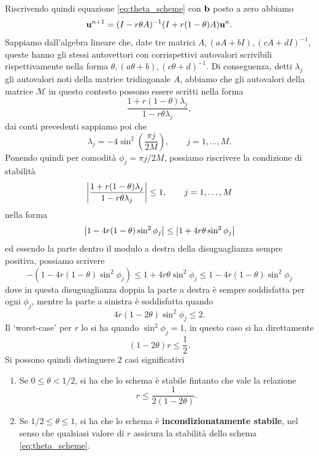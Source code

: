 \documentclass[10pt,a4paper]{article}
\begin{document}
Riscrivendo quindi equazione \eqref{eq:theta_scheme} con $\vb{b}$ posto a zero abbiamo
\begin{equation}
	\vb{u}^{n+1} = (I-r\theta A)^{-1}(I+r(1-\theta)A)\vb{u}^n.
\end{equation}
Sappiamo dall'algebra lineare che, date tre matrici $A, (aA+bI), (cA+dI)^{-1}$, queste hanno gli stessi autovettori con corrispettivi autovalori scrivibili rispettivamente nella forma $\theta, (a\theta + b), (c\theta +d)^{-1}$. Di conseguenza, detti $\lambda_j$ gli autovalori noti della matrice tridiagonale $A$, abbiamo che gli autovalori della matrice $\mathcal{M}$ in questo contesto possono essere scritti nella forma
\begin{equation}
	\frac{1+r(1-\theta)\lambda_{j}}{1-r\theta\lambda_j},
\end{equation}
dai conti precedenti sappiamo poi che
\begin{equation}
	\lambda_j = -4 \sin^2\left(\frac{\pi j}{2M}\right),\quad\quad j=1,\ldots,M.
\end{equation}
Ponendo quindi per comodità $\phi_j = \pi j/2M$, possiamo riscrivere la condizione di stabilità
\begin{equation}
	\abs{\frac{1+r(1-\theta)\lambda_{j}}{1-r\theta\lambda_j}}\leq 1, \quad\quad j=1,\ldots,M
\end{equation}
nella forma
\begin{equation}
	\abs{1-4r(1-\theta)\sin^2{\phi_j}}\leq\abs{1+4r\theta\sin^2{\phi_j}}
\end{equation}
ed essendo la parte dentro il modulo a destra della disuguaglianza sempre positiva, possiamo scrivere
\begin{equation}
	-(1-4r(1-\theta)\sin^2{\phi_j})\leq{1+4r\theta\sin^2{\phi_j}}\leq 1-4r(1-\theta)\sin^2{\phi_j}
\end{equation}
dove in questa disuguaglianza doppia la parte a destra è sempre soddisfatta per ogni $\phi_j$, mentre la parte a sinistra è soddisfatta quando
\begin{equation}
	4r(1-2\theta)\sin^2\phi_j \leq 2.
\end{equation}
Il `worst-case' per $r$ lo si ha quando $\sin^2 \phi_j = 1$, in questo caso si ha direttamente
\begin{equation}
  	(1-2\theta)r\leq\frac{1}{2}.
\end{equation}  
Si possono quindi distinguere 2 casi significativi
\begin{enumerate}
	\item Se $0\leq\theta < 1/2$, si ha che lo schema è stabile fintanto che vale la relazione
	\begin{equation}
	 	r\leq\frac{1}{2(1-2\theta)}.
	\end{equation}
	\item Se $1/2 \leq \theta \leq 1$, si ha che lo schema è \textbf{incondizionatamente stabile}, nel senso che qualsiasi valore di $r$ assicura la stabilità dello schema \eqref{eq:theta_scheme}.
\end{enumerate}
\end{document}

